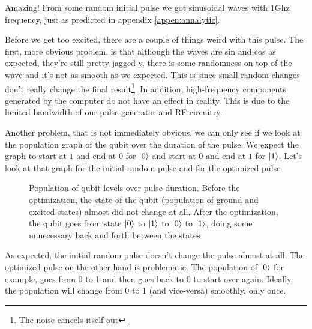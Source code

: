 Amazing! From some random initial pulse we got sinusoidal waves with $1$Ghz frequency, just as predicted in appendix \ref{appen:annalytic}.

Before we get too excited, there are a couple of things weird with this pulse. The first, more obvious problem, is that although the waves are sin and cos as expected, they're still pretty jagged-y, there is some randomness on top of the wave and it's not as smooth as we expected. This is since small random changes don't really change the final result\footnote{The noise cancels itself out}. In addition, high-frequency components generated  by the computer do not have an effect in reality. This is due to the limited bandwidth of our pulse generator and RF circuitry.

Another problem, that is not immediately obvious, we can only see if we look at the population graph of the qubit over the duration of the pulse. We expect the graph to start at $1$ and end at $0$ for $\ket{0}$ and start at $0$ and end at $1$ for $\ket{1}$. Let's look at that graph for the initial random pulse and for the optimized pulse
\begin{figure}[H]
    \begin{center}
        
    \end{center}
    \caption{Population of qubit levels over pulse duration. Before the optimization, the state of the qubit (population of ground and excited states) almost did not change at all. After the optimization, the qubit goes from state $\ket{0}$ to $\ket{1}$ to $\ket{0}$ to $\ket{1}$, doing some unnecessary back and forth between the states}
    \label{fig:GRAPE-first-example-level-population}
\end{figure}
As expected, the initial random pulse doesn't change the pulse almost at all. The optimized pulse on the other hand is problematic. The population of $\ket{0}$ for example, goes from 0 to 1 and then goes back to 0 to start over again. Ideally, the population will change from 0 to 1 (and vice-versa) smoothly, only once.

